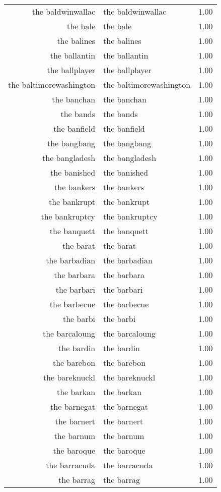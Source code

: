\begin{table}[ht]
\begin{tabular}{rlr}
  the baldwinwallac & the baldwinwallac & 1.00 \\ 
  the bale & the bale & 1.00 \\ 
  the balines & the balines & 1.00 \\ 
  the ballantin & the ballantin & 1.00 \\ 
  the ballplayer & the ballplayer & 1.00 \\ 
  the baltimorewashington & the baltimorewashington & 1.00 \\ 
  the banchan & the banchan & 1.00 \\ 
  the bands & the bands & 1.00 \\ 
  the banfield & the banfield & 1.00 \\ 
  the bangbang & the bangbang & 1.00 \\ 
  the bangladesh & the bangladesh & 1.00 \\ 
  the banished & the banished & 1.00 \\ 
  the bankers & the bankers & 1.00 \\ 
  the bankrupt & the bankrupt & 1.00 \\ 
  the bankruptcy & the bankruptcy & 1.00 \\ 
  the banquett & the banquett & 1.00 \\ 
  the barat & the barat & 1.00 \\ 
  the barbadian & the barbadian & 1.00 \\ 
  the barbara & the barbara & 1.00 \\ 
  the barbari & the barbari & 1.00 \\ 
  the barbecue & the barbecue & 1.00 \\ 
  the barbi & the barbi & 1.00 \\ 
  the barcaloung & the barcaloung & 1.00 \\ 
  the bardin & the bardin & 1.00 \\ 
  the barebon & the barebon & 1.00 \\ 
  the bareknuckl & the bareknuckl & 1.00 \\ 
  the barkan & the barkan & 1.00 \\ 
  the barnegat & the barnegat & 1.00 \\ 
  the barnert & the barnert & 1.00 \\ 
  the barnum & the barnum & 1.00 \\ 
  the baroque & the baroque & 1.00 \\ 
  the barracuda & the barracuda & 1.00 \\ 
  the barrag & the barrag & 1.00 \\ 

\end{tabular}
\end{table}

